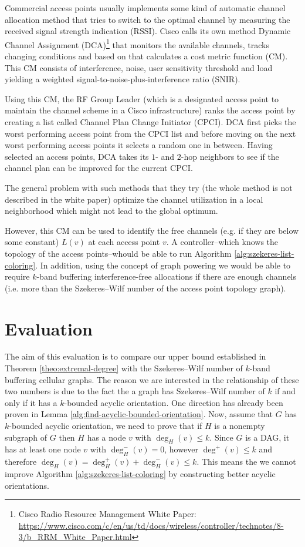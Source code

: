 \documentclass[a4paper, 12pt]{article}
\begin{document}
Commercial access points usually implements some kind of automatic channel allocation method that tries to switch to the optimal channel by measuring the received signal strength indication (RSSI). Cisco calls its own method Dynamic Channel Assignment (DCA)\footnote{Cisco Radio Resource Management White Paper: \url{https://www.cisco.com/c/en/us/td/docs/wireless/controller/technotes/8-3/b_RRM_White_Paper.html}} that monitors the available channels, tracks changing conditions and based on that calculates a cost metric function (CM). This CM consists of interference, noise, user sensitivity threshold and load yielding a weighted signal-to-noise-plus-interference ratio (SNIR).

Using this CM, the RF Group Leader (which is a designated access point to maintain the channel scheme in a Cisco infrastructure) ranks the access point by creating a list called Channel Plan Change Initiator (CPCI). DCA first picks the worst performing access point from the CPCI list and before moving on the next worst performing access points it selects a random one in between. Having selected an access points, DCA takes its $1$- and $2$-hop neighbors to see if the channel plan can be improved for the current CPCI.

The general problem with such methods that they try (the whole method is not described in the white paper) optimize the channel utilization in a local neighborhood which might not lead to the global optimum.

However, this CM can be used to identify the free channels (e.g. if they are below some constant) $L(v)$ at each access point $v$. A controller\---which knows the topology of the access points\---whould be able to run Algorithm \ref{alg:szekeres-list-coloring}. In addition, using the concept of graph powering we would be able to require $k$-band buffering interference-free allocations if there are enough channels (i.e. more than the Szekeres\---Wilf number of the access point topology graph).
\section{Evaluation}\label{sec:eval}
The aim of this evaluation is to compare our upper bound established in Theorem \ref{theo:extremal-degree} with the Szekeres\---Wilf number of $k$-band buffering cellular graphs. The reason we are interested in the relationship of these two numbers is due to the fact the a graph has Szekeres\---Wilf number of $k$ if and only if it has a $k$-bounded acyclic orientation. One direction has already been proven in Lemma \ref{alg:find-acyclic-bounded-orientation}. Now, assume that $G$ has $k$-bounded acyclic orientation, we need to prove that if $H$ is a nonempty subgraph of $G$ then $H$ has a node $v$ with $\deg_H(v) \leqslant k$. Since $G$ is a DAG, it has at least one node $v$ with $\deg_{H}^-(v)=0$, however $\deg^+(v) \leqslant k$ and therefore $\deg_H(v) = \deg_{H}^+(v) + \deg_{H}^-(v) \leqslant k$. This means the we cannot improve Algorithm \ref{alg:szekeres-list-coloring} by constructing better acyclic orientations.
\end{document}
